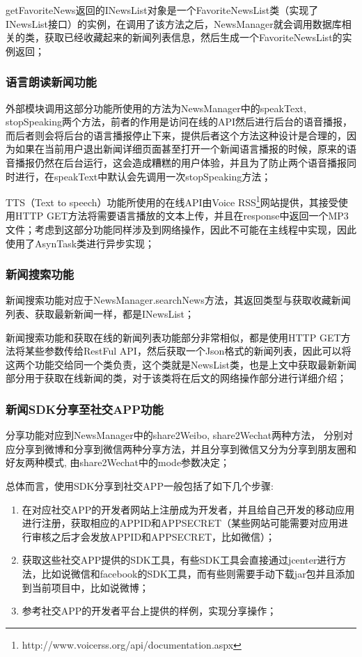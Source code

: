 \documentclass[UTF8]{ctexart}
\begin{document}
		getFavoriteNews返回的INewsList对象是一个FavoriteNewsList类（实现了INewsList接口）的实例，在调用了该方法之后，NewsManager就会调用数据库相关的类，获取已经收藏起来的新闻列表信息，然后生成一个FavoriteNewsList的实例返回；

	\subsubsection{语言朗读新闻功能}
		外部模块调用这部分功能所使用的方法为NewsManager中的speakText, stopSpeaking两个方法，前者的作用是访问在线的API然后进行后台的语音播报，而后者则会将后台的语言播报停止下来，提供后者这个方法这种设计是合理的，因为如果在当前用户退出新闻详细页面甚至打开一个新闻语言播报的时候，原来的语音播报仍然在后台运行，这会造成糟糕的用户体验，并且为了防止两个语音播报同时进行，在speakText中默认会先调用一次stopSpeaking方法；

		TTS（Text to speech）功能所使用的在线API由Voice RSS\footnote{http://www.voicerss.org/api/documentation.aspx}网站提供，其接受使用HTTP GET方法将需要语言播放的文本上传，并且在response中返回一个MP3文件；考虑到这部分功能同样涉及到网络操作，因此不可能在主线程中实现，因此使用了AsynTask类进行异步实现；

	\subsubsection{新闻搜索功能}
		新闻搜索功能对应于NewsManager.searchNews方法，其返回类型与获取收藏新闻列表、获取最新新闻一样，都是INewsList；

		新闻搜索功能和获取在线的新闻列表功能部分非常相似，都是使用HTTP GET方法将某些参数传给RestFul API，然后获取一个Json格式的新闻列表，因此可以将这两个功能交给同一个类负责，这个类就是NewsList类，也是上文中获取最新新闻部分用于获取在线新闻的类，对于该类将在后文的网络操作部分进行详细介绍；

	\subsubsection{新闻SDK分享至社交APP功能}
		分享功能对应到NewsManager中的share2Weibo, share2Wechat两种方法， 分别对应分享到微博和分享到微信两种分享方法，并且分享到微信又分为分享到朋友圈和好友两种模式, 由share2Wechat中的mode参数决定；

		总体而言，使用SDK分享到社交APP一般包括了如下几个步骤:
		
		\begin{enumerate}[(1)]
			\item 在对应社交APP的开发者网站上注册成为开发者，并且给自己开发的移动应用进行注册，获取相应的APPID和APPSECRET（某些网站可能需要对应用进行审核之后才会发放APPID和APPSECRET，比如微信）；
			\item 获取这些社交APP提供的SDK工具，有些SDK工具会直接通过jcenter进行方法，比如说微信和facebook的SDK工具，而有些则需要手动下载jar包并且添加到当前项目中，比如说微博；
			\item 参考社交APP的开发者平台上提供的样例，实现分享操作；
		\end{enumerate}
\end{document}
